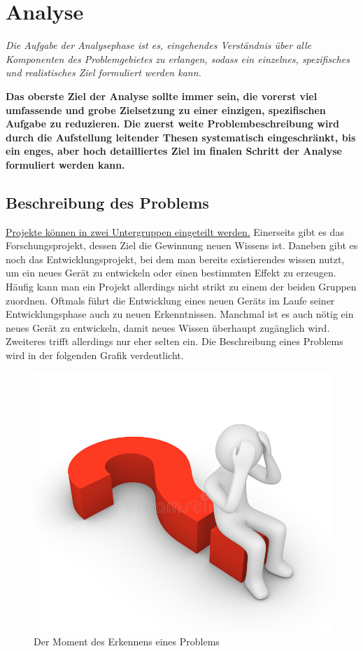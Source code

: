 \section{Analyse} \label{chap:2}

\textit{Die Aufgabe der Analysephase ist es, eingehendes Verständnis über alle Komponenten des Problemgebietes 
zu erlangen, sodass ein einzelnes, spezifisches und realistisches Ziel formuliert werden kann.}

\textbf{Das oberste Ziel der Analyse sollte immer sein, die vorerst viel umfassende und grobe Zielsetzung zu 
einer einzigen, spezifischen Aufgabe zu reduzieren. Die zuerst weite Problembeschreibung wird durch 
die Aufstellung leitender Thesen systematisch eingeschränkt, bis ein enges, aber hoch detailliertes 
Ziel im finalen Schritt der Analyse formuliert werden kann.}

    \subsection{Beschreibung des Problems}

    \underline{Projekte können in zwei Untergruppen eingeteilt werden.} Einerseits gibt es das Forschungsprojekt, 
    dessen Ziel die Gewinnung neuen Wissens ist. Daneben gibt es noch das Entwicklungsprojekt, bei dem 
    man bereits existierendes wissen nutzt, um ein neues Gerät zu entwickeln oder einen bestimmten 
    Effekt zu erzeugen. Häufig kann man ein Projekt allerdings nicht strikt zu einem der beiden 
    Gruppen zuordnen. Oftmals führt die Entwicklung eines neuen Geräts im Laufe seiner Entwicklungsphase 
    auch zu neuen Erkenntnissen. Manchmal ist es auch nötig ein neues Gerät zu entwickeln, damit neues 
    Wissen überhaupt zugänglich wird. Zweiteres trifft allerdings nur eher selten ein.
    Die Beschreibung eines Problems wird in der folgenden Grafik verdeutlicht.

    \begin{figure}[H]
        \centering
        \includegraphics[width=0.5\linewidth]{graphics/problem.jpg}
        \caption[Problemerkennung]{Der Moment des Erkennens eines Problems}

        
        \label{fig:problemloesung}
    \end{figure}

